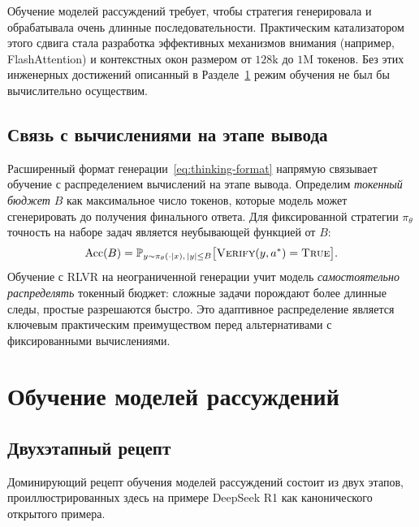 \begin{remark}
Обучение моделей рассуждений требует, чтобы стратегия генерировала и обрабатывала
очень длинные последовательности. Практическим катализатором этого сдвига стала
разработка эффективных механизмов внимания (например, FlashAttention)
и контекстных окон размером от $128\text{k}$ до $1\text{M}$ токенов. Без этих
инженерных достижений описанный в
Разделе~\ref{sec:training-reasoning} режим обучения не был бы вычислительно
осуществим.
\end{remark}

\subsection{Связь с вычислениями на этапе вывода}
\label{subsec:cot-inference-compute}

Расширенный формат генерации~\eqref{eq:thinking-format}
напрямую связывает обучение с распределением вычислений на этапе вывода. Определим
\emph{токенный бюджет} $B$ как максимальное число
токенов, которые модель может сгенерировать до получения финального ответа. Для
фиксированной стратегии $\pi_\theta$ точность на наборе задач является
неубывающей функцией от $B$:
\[
\text{Acc}(B) = \mathbb{P}_{y \sim \pi_\theta(\cdot|x),\,|y| \le B}
               \bigl[\textsc{Verify}(y, a^*) = \textsc{True}\bigr].
\]
Обучение с RLVR на неограниченной генерации учит модель
\emph{самостоятельно распределять} токенный бюджет: сложные задачи порождают более длинные
следы, простые разрешаются быстро. Это адаптивное распределение является
ключевым практическим преимуществом перед альтернативами с фиксированными вычислениями.

\section{Обучение моделей рассуждений}
\label{sec:training-reasoning}

\subsection{Двухэтапный рецепт}

Доминирующий рецепт обучения моделей рассуждений состоит из двух
этапов, проиллюстрированных здесь на примере DeepSeek R1 как канонического открытого
примера.

